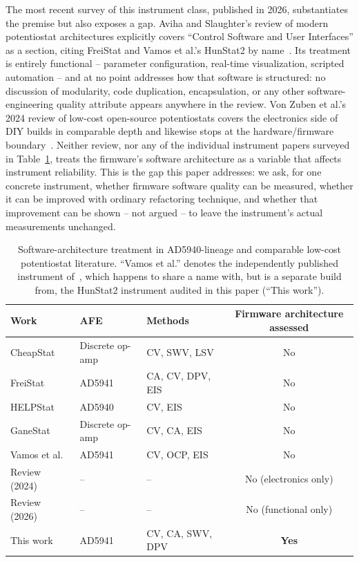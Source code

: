 The most recent survey of this instrument class, published in 2026,
substantiates the premise but also exposes a gap. Aviha and Slaughter's
review of modern potentiostat architectures explicitly covers ``Control
Software and User Interfaces'' as a section, citing FreiStat and Vamos et
al.'s HunStat2 by name~\cite{aviha2026modern}. Its treatment is entirely functional --
parameter configuration, real-time visualization, scripted automation -- and
at no point addresses how that software is structured: no discussion of
modularity, code duplication, encapsulation, or any other software-engineering
quality attribute appears anywhere in the review. Von Zuben et al.'s 2024
review of low-cost open-source potentiostats covers the electronics side of
DIY builds in comparable depth and likewise stops at the hardware/firmware
boundary~\cite{vonzuben2024lowcost}. Neither review, nor any of the
individual instrument papers surveyed in
Table~\ref{tab:related}, treats the firmware's software architecture as a
variable that affects instrument reliability. This is the gap this paper
addresses: we ask, for one concrete instrument, whether firmware software
quality can be measured, whether it can be improved with ordinary
refactoring technique, and whether that improvement can be shown -- not
argued -- to leave the instrument's actual measurements unchanged.

\begin{table}[h]
\centering
\caption{Software-architecture treatment in AD5940-lineage and comparable
low-cost potentiostat literature. ``Vamos et al.'' denotes the independently
published instrument of~\cite{vamos2025hunstat2}, which happens to share a
name with, but is a separate build from, the HunStat2 instrument audited in
this paper (``This work'').}
\label{tab:related}
\begin{threeparttable}
\begin{tabular}{@{}lllc@{}}
\toprule
Work & AFE & Methods & Firmware architecture assessed \\
\midrule
CheapStat~\cite{rowe2011cheapstat}       & Discrete op-amp & CV, SWV, LSV & No \\
FreiStat~\cite{bill2023electrochemical}  & AD5941      & CA, CV, DPV, EIS & No \\
HELPStat~\cite{bautista2025helpstat}     & AD5940      & CV, EIS      & No \\
GaneStat~\cite{anshori2025ganestat}      & Discrete op-amp & CV, CA, EIS & No \\
Vamos et al.~\cite{vamos2025hunstat2}    & AD5941      & CV, OCP, EIS & No \\
Review (2024)~\cite{vonzuben2024lowcost} & --          & --           & No (electronics only) \\
Review (2026)~\cite{aviha2026modern}     & --          & --           & No (functional only) \\
This work                                & AD5941      & CV, CA, SWV, DPV & \textbf{Yes} \\
\bottomrule
\end{tabular}
\end{threeparttable}
\end{table}

